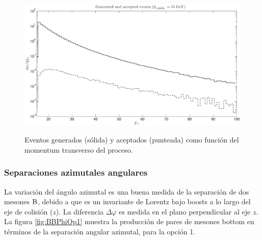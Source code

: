 \documentclass[a4paper,12pt]{article}
\begin{document}
\begin{figure}[h]
\centering
\caption[Eventos generados y aceptados en colisiones hadrónicas.]{Eventos generados (sólida) y aceptados (punteada) como función del momentum transverso del proceso.}
\includegraphics[width=15cm]{Accepted}
\label{fig:accepted}
\end{figure}

\subsubsection{Separaciones azimutales angulares}

La variación del ángulo azimutal es una buena medida de la separación de dos mesones ${\mathrm B}$, debido a que es un invariante de Lorentz bajo boosts a lo largo del eje de colisión ($z$). La diferencia $\Delta \varphi$  es medida en el plano perpendicular al eje $z$. La figura \ref{fig:BBPhiOp1}  muestra la producción de pares de mesones bottom en términos de la separación angular azimutal, para la opción 1.
\end{document}
